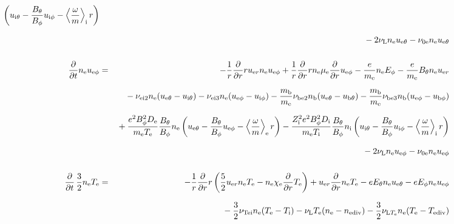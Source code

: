 \documentclass[11pt]{article}
\def\r#1{{\rm#1}}
\def\ddt{\frac{\partial}{\partial t}}
\def\ddr{\frac{\partial}{\partial r}}
\def\ave#1{\left\langle#1\right\rangle}
\def\me{m_\r{e}}
\def\mb{m_\r{b}}
\def\mue{\mu_\r{e}}
\def\mui{\mu_\r{i}}
\def\De{D_\r{e}}
\def\Di{D_\r{i}}
\def\chie{\chi_\r{e}}
\def\ne{n_\r{e}}
\def\ni{n_\r{i}}
\def\nb{n_\r{b}}
\def\uer{u_{\r{e}r}}
\def\ueth{u_{\r{e}\theta}}
\def\uith{u_{\r{i}\theta}}
\def\ubth{u_{\r{b}\theta}}
\def\ueph{u_{\r{e}\phi}}
\def\uiph{u_{\r{i}\phi}}
\def\ubph{u_{\r{b}\phi}}
\def\Eth{E_\theta}
\def\Eph{E_\phi}
\def\Bth{B_\theta}
\def\Bph{B_\phi}
\def\Te{T_\r{e}}
\def\Ti{T_\r{i}}
\def\Zi{Z_\r{i}}
\def\nube{\nu_\r{be}}
\def\nune{\nu_\r{0e}}
\def\nuL{\nu_\r{L}}
\def\nuTei{\nu_\r{Tei}}
\def\vb{v_\r{b}}
\def\nediv{n_\r{ediv}}
\def\Tediv{T_\r{ediv}}
\def\nuLTe{\nu_{\r{L}T_\r{e}}}
\newcommand{\Frac}[2]{%
  {\displaystyle {\displaystyle #1\over \displaystyle #2}}%
}
\newcommand{\rdprd}[2]{\Frac{\partial #1}{\partial #2}}
\newcommand{\aveaveB}[1]{\left< \!\! \left< #1 \right> \!\! \right>}
\begin{document}
\begin{eqnarray}
    \left(\uith - \frac{\Bth}{\Bph}\uiph - \ave{\frac{\omega}{m}}_\r{i}
     r \right)
\nonumber\\[2.5mm]&&{}
%
%
  - 2 \nuL \ne \ueth
%
  - \nune \ne \ueth
%
%
\\[5mm]
%
%
  \ddt \ne \ueph &=&
%
  - \frac{1}{r} \ddr r \uer \ne \ueph
%
  + \frac{1}{r} \ddr r \ne \mue \ddr \ueph
%
  - \frac{e}{\me} \ne \Eph
%
  - \frac{e}{\me} \Bth \ne \uer 
\nonumber\\[2.5mm]&&{}
%
  - \nu_\r{ei2} \ne (\ueth - \uith)
%
  - \nu_\r{ei3} \ne (\ueph - \uiph)
%
  - \frac{\mb}{\me} \nu_\r{be2} \nb (\ueth - \ubth)
%
  - \frac{\mb}{\me} \nu_\r{be3} \nb (\ueph - \ubph)
\nonumber\\[2.5mm]&&{}
%
  + \frac{e^2 \Bph^2 \De}{\me\Te}\frac{\Bth}{\Bph}\ne
    \left(\ueth - \frac{\Bth}{\Bph}\ueph - \ave{\frac{\omega}{m}}_\r{e}
     r \right)
%
  - \frac{\Zi^2 e^2 \Bph^2 \Di}{\me\Ti}\frac{\Bth}{\Bph}\ni
    \left(\uith - \frac{\Bth}{\Bph}\uiph - \ave{\frac{\omega}{m}}_\r{i}
     r \right)
\nonumber\\[2.5mm]&&{}
%
  - 2 \nuL \ne \ueph
%
  - \nune \ne \ueph
%
%
\\[5mm]
%
%
  \ddt \, \frac{3}{2} \ne \Te &=&
%
 - \frac{1}{r} \ddr r
   \left( \frac{5}{2} \uer \ne \Te - \ne \chie \ddr \Te \right)
%
  +  \uer \ddr \ne \Te
%
  -  e \Eth \ne \ueth
%
  -  e \Eph \ne \ueph 
\nonumber\\[2.5mm]&&{}
%
  - \frac{3}{2} \nuTei \ne (\Te - \Ti)
%
%
  - \nuL \Te (\ne - \nediv)
%
  - \frac{3}{2} \nuLTe \ne (\Te - \Tediv)
\nonumber\\[2.5mm]&&{}

\end{eqnarray}
\end{document}
